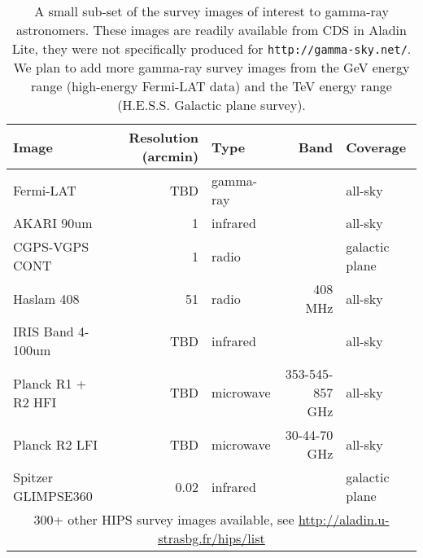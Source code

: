 
\begin{table}[tb]

\caption{
A small sub-set of the survey images of interest to gamma-ray astronomers.
These images are readily available from CDS in Aladin Lite, they were not specifically
produced for \texttt{http://gamma-sky.net/}. We plan to add more gamma-ray survey images
from the GeV energy range (high-energy Fermi-LAT data) and the TeV energy range
(H.E.S.S. Galactic plane survey).
}
\label{tab:images}
\begin{tabular}{ lrlrl }
\hline
Image & Resolution (arcmin) & Type & Band & Coverage\\
\hline
Fermi-LAT & TBD & gamma-ray &  & all-sky\\
AKARI 90um & 1 & infrared &  & all-sky\\
CGPS-VGPS CONT & 1 & radio &  & galactic plane\\
Haslam 408 & 51 & radio & 408 MHz & all-sky\\
IRIS Band 4-100um & TBD & infrared &  & all-sky\\
Planck R1 + R2 HFI & TBD & microwave & 353-545-857 GHz & all-sky\\
Planck R2 LFI & TBD & microwave & 30-44-70 GHz & all-sky\\
Spitzer GLIMPSE360 & 0.02 & infrared &  & galactic plane\\
\multicolumn{5}{c}{300+ other HIPS survey images available, see \url{http://aladin.u-strasbg.fr/hips/list}} \\
\hline
\end{tabular}

\end{table}
